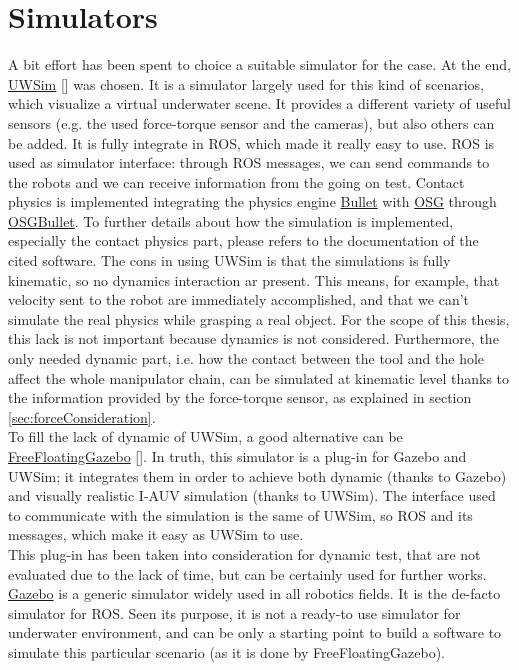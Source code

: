 \section{Simulators}
\label{sec:simulators}
A bit effort has been spent to choice a suitable simulator for the case. At the end, \href{http://www.irs.uji.es/uwsim/}{UWSim} [\cite{uwsim}] was chosen. It is a simulator largely used for this kind of scenarios, which visualize a virtual underwater scene. It provides a different variety of useful sensors (e.g. the used force-torque sensor and the cameras), but also others can be added. It is fully integrate in ROS, which made it really easy to use. ROS is used as simulator interface: through ROS messages, we can send commands to the robots and we can receive information from the going on test. Contact physics is implemented integrating the physics engine \href{https://pybullet.org/wordpress/}{Bullet} with \href{http://www.openscenegraph.org/}{OSG} through \href{https://github.com/mccdo/osgbullet}{OSGBullet}. To further details about how the simulation is implemented, especially the contact physics part, please refers to the documentation of the cited software. The cons in using UWSim is that the simulations is fully kinematic, so no dynamics interaction ar present. This means, for example, that velocity sent to the robot are immediately accomplished, and that we can't simulate the real physics while grasping a real object. For the scope of this thesis, this lack is not important because dynamics is not considered. Furthermore, the only needed dynamic part, i.e. how the contact between the tool and the hole affect the whole manipulator chain, can be simulated at kinematic level thanks to the information provided by the force-torque sensor, as explained in section \ref{sec:forceConsideration}.\\
To fill the lack of dynamic of UWSim, a good alternative can be \href{https://github.com/freefloating-gazebo/freefloating_gazebo}{FreeFloatingGazebo} [\cite{freeFloatingGazebo}]. In truth, this simulator is a plug-in for Gazebo and UWSim; it integrates them in order to achieve both dynamic (thanks to Gazebo) and visually realistic I-AUV simulation (thanks to UWSim). The interface used to communicate with the simulation is the same of UWSim, so ROS and its messages, which make it easy as UWSim to use. \\
This plug-in has been taken into consideration for dynamic test, that are not evaluated due to the lack of time, but can be certainly used for further works.
\href{http://gazebosim.org/}{Gazebo} is a generic simulator widely used in all robotics fields. It is the de-facto simulator for ROS. Seen its purpose, it is not a ready-to use simulator for underwater environment, and can be only a starting point to build a software to simulate this particular scenario (as it is done by FreeFloatingGazebo).\\
